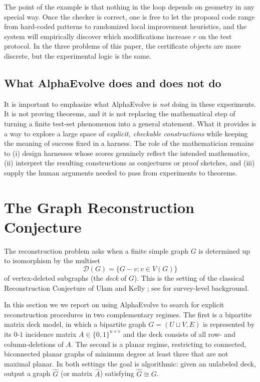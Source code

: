 \documentclass[11pt]{amsart}
\begin{document}
The point of the example is that nothing in the loop depends on geometry in any special way.
Once the checker is correct, one is free to let the proposal code range from hard-coded patterns to randomized local improvement heuristics, and the system will empirically discover which modifications increase $r$ on the test protocol.
In the three problems of this paper, the certificate objects are more discrete, but the experimental logic is the same.

\subsection{What AlphaEvolve does and does not do}
It is important to emphasize what AlphaEvolve is \emph{not} doing in these experiments.
It is not proving theorems, and it is not replacing the mathematical step of turning a finite test-set phenomenon into a general statement.
What it provides is a way to explore a large space of \emph{explicit, checkable constructions} while keeping the meaning of success fixed in a harness.
The role of the mathematician remains to (i) design harnesses whose scores genuinely reflect the intended mathematics, (ii) interpret the resulting constructions as conjectures or proof sketches, and (iii) supply the human arguments needed to pass from experiments to theorems.


\section{The Graph Reconstruction Conjecture}
\label{sec:partIintro}

The reconstruction problem asks when a finite simple graph $G$ is determined up to isomorphism by the multiset
\[
\mathcal{D}(G)=\{G-v : v\in V(G)\}
\]
of vertex-deleted subgraphs (the \emph{deck} of $G$).
This is the setting of the classical Reconstruction Conjecture of Ulam and Kelly \cite{Ulam1960,Kelly1957}; see \cite{BondyHemminger1977} for survey-level background.

In this section we we report on using AlphaEvolve to search for explicit reconstruction procedures in two complementary regimes.
The first is a bipartite matrix deck model, in which a bipartite graph $G=(U\sqcup V,E)$ is represented by its $0$-$1$ incidence matrix $A\in\{0,1\}^{u\times v}$ and the deck consists of all row- and column-deletions of $A$.
The second is a planar regime, restricting to connected, biconnected planar graphs of minimum degree at least three that are not maximal planar.
In both settings the goal is algorithmic: given an unlabeled deck, output a graph $\widehat{G}$ (or matrix $\widehat{A}$) satisfying $\widehat{G}\cong G$.
\end{document}
